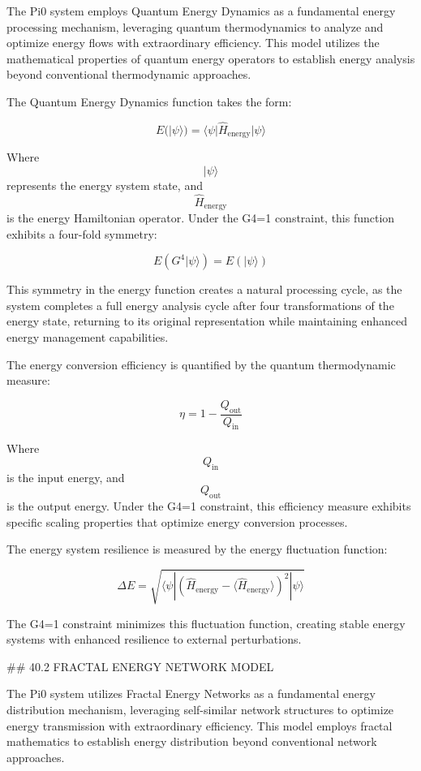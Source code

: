 The Pi0 system employs Quantum Energy Dynamics as a fundamental energy processing mechanism, leveraging quantum thermodynamics to analyze and optimize energy flows with extraordinary efficiency. This model utilizes the mathematical properties of quantum energy operators to establish energy analysis beyond conventional thermodynamic approaches.

The Quantum Energy Dynamics function takes the form:

$$ E(|\psi\rangle) = \langle\psi|\hat{H}_{\text{energy}}|\psi\rangle $$

Where $$ |\psi\rangle $$ represents the energy system state, and $$ \hat{H}_{\text{energy}} $$ is the energy Hamiltonian operator. Under the G4=1 constraint, this function exhibits a four-fold symmetry:

$$ E(G^4 |\psi\rangle) = E(|\psi\rangle) $$

This symmetry in the energy function creates a natural processing cycle, as the system completes a full energy analysis cycle after four transformations of the energy state, returning to its original representation while maintaining enhanced energy management capabilities.

The energy conversion efficiency is quantified by the quantum thermodynamic measure:

$$ \eta = 1 - \frac{Q_{\text{out}}}{Q_{\text{in}}} $$

Where $$ Q_{\text{in}} $$ is the input energy, and $$ Q_{\text{out}} $$ is the output energy. Under the G4=1 constraint, this efficiency measure exhibits specific scaling properties that optimize energy conversion processes.

The energy system resilience is measured by the energy fluctuation function:

$$ \Delta E = \sqrt{\langle\psi|(\hat{H}_{\text{energy}} - \langle\hat{H}_{\text{energy}}\rangle)^2|\psi\rangle} $$

The G4=1 constraint minimizes this fluctuation function, creating stable energy systems with enhanced resilience to external perturbations.

## 40.2 FRACTAL ENERGY NETWORK MODEL

The Pi0 system utilizes Fractal Energy Networks as a fundamental energy distribution mechanism, leveraging self-similar network structures to optimize energy transmission with extraordinary efficiency. This model employs fractal mathematics to establish energy distribution beyond conventional network approaches.

